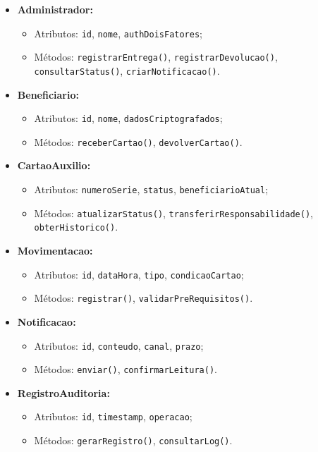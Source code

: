 \documentclass[
  article,
  a4paper,
  12pt,
  oneside,
  fleqn
]{abntex2}
\begin{document}
\begin{itemize}
    \item \textbf{Administrador:}
    \begin{itemize}
        \item Atributos: \texttt{id}, \texttt{nome}, \texttt{authDoisFatores};
        \item Métodos: \texttt{registrarEntrega()}, \texttt{registrarDevolucao()},\\ \texttt{consultarStatus()}, \texttt{criarNotificacao()}.
    \end{itemize}

    \item \textbf{Beneficiario:}
    \begin{itemize}
        \item Atributos: \texttt{id}, \texttt{nome}, \texttt{dadosCriptografados};
        \item Métodos: \texttt{receberCartao()}, \texttt{devolverCartao()}.
    \end{itemize}

    \item \textbf{CartaoAuxilio:}
    \begin{itemize}
        \item Atributos: \texttt{numeroSerie}, \texttt{status}, \texttt{beneficiarioAtual};
        \item Métodos: \texttt{atualizarStatus()}, \texttt{transferirResponsabilidade()},\\ \texttt{obterHistorico()}.
    \end{itemize}

    \item \textbf{Movimentacao:}
    \begin{itemize}
        \item Atributos: \texttt{id}, \texttt{dataHora}, \texttt{tipo}, \texttt{condicaoCartao};
        \item Métodos: \texttt{registrar()}, \texttt{validarPreRequisitos()}.
    \end{itemize}

    \item \textbf{Notificacao:}
    \begin{itemize}
        \item Atributos: \texttt{id}, \texttt{conteudo}, \texttt{canal}, \texttt{prazo};
        \item Métodos: \texttt{enviar()}, \texttt{confirmarLeitura()}.
    \end{itemize}

    \item \textbf{RegistroAuditoria:}
    \begin{itemize}
        \item Atributos: \texttt{id}, \texttt{timestamp}, \texttt{operacao};
        \item Métodos: \texttt{gerarRegistro()}, \texttt{consultarLog()}.
    \end{itemize}
\end{itemize}
\end{document}
